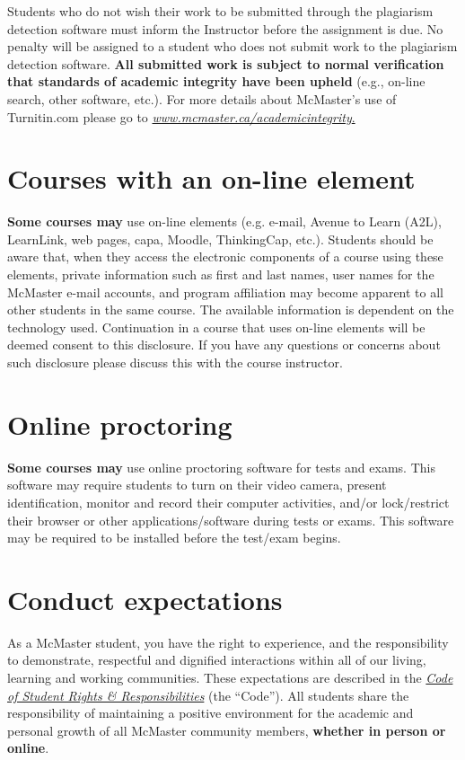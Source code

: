 \documentclass[12pt]{article}
\begin{document}
Students who do not wish their work to be submitted through the
plagiarism detection software must inform the Instructor before the
assignment is due. No penalty will be assigned to a student who does not
submit work to the plagiarism detection software. \textbf{All submitted
work is subject to normal verification that standards of academic
integrity have been upheld} (e.g., on-line search, other software,
etc.). For more details about McMaster's use of Turnitin.com please go
to
\href{http://www.mcmaster.ca/academicintegrity}{\emph{www.mcmaster.ca/academicintegrity}.}

\section*{Courses with an on-line element}

\textbf{Some courses may} use on-line elements (e.g. e-mail,
Avenue to Learn (A2L), LearnLink, web pages, capa, Moodle, ThinkingCap,
etc.). Students should be aware that, when they access the electronic
components of a course using these elements, private information such as
first and last names, user names for the McMaster e-mail accounts, and
program affiliation may become apparent to all other students in the
same course. The available information is dependent on the technology
used. Continuation in a course that uses on-line elements will be deemed
consent to this disclosure. If you have any questions or concerns about
such disclosure please discuss this with the course instructor.

\section*{Online proctoring}

\textbf{Some courses may} use online proctoring software for tests and
exams. This software may require students to turn on their video camera,
present identification, monitor and record their computer activities,
and/or lock/restrict their browser or other applications/software during
tests or exams. This software may be required to be installed before the
test/exam begins.

\section*{Conduct expectations}

As a McMaster student, you have the right to experience, and the
responsibility to demonstrate, respectful and dignified interactions
within all of our living, learning and working communities. These
expectations are described in the
\href{https://secretariat.mcmaster.ca/app/uploads/Code-of-Student-Rights-and-Responsibilities.pdf}{\emph{\emph{Code
of Student Rights \& Responsibilities}}} (the ``Code''). All students
share the responsibility of maintaining a positive environment for the
academic and personal growth of all McMaster community members,
\textbf{whether in person or online}.
\end{document}
